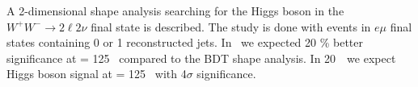 A 2-dimensional shape analysis searching for the Higgs boson 
in the $W^+W^- \to 2\ell2\nu$ final state is described.
The study is done with events in $e\mu$ final states containing
0 or 1 reconstructed jets. In \intlumiEightTeV~we expected 20 \% 
better significance at \mHi = 125 \GeV~compared to the BDT shape analysis. 
In 20~\ifb~we expect Higgs boson signal at \mHi = 125 \GeV~with 4$\sigma$ 
significance.
